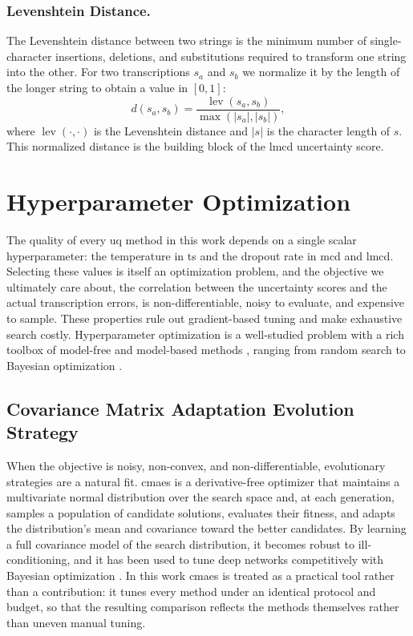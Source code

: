 \subsubsection{Levenshtein Distance.}
The Levenshtein distance \cite{levenshtein1966binary} between two strings is the minimum number of single-character insertions, deletions, and substitutions required to transform one string into the other. For two transcriptions $s_a$ and $s_b$ we normalize it by the length of the longer string to obtain a value in $[0, 1]$:
\begin{equation}
   d(s_a, s_b) = \frac{\operatorname{lev}(s_a, s_b)}{\max(|s_a|, |s_b|)},
\end{equation}
where $\operatorname{lev}(\cdot, \cdot)$ is the Levenshtein distance and $|s|$ is the character length of $s$. This normalized distance is the building block of the \acrshort{lmcd} uncertainty score.

\section{Hyperparameter Optimization}\label{sec:hpo}

The quality of every \acrshort{uq} method in this work depends on a single scalar hyperparameter: the temperature in \acrshort{ts} and the dropout rate in \acrshort{mcd} and \acrshort{lmcd}. Selecting these values is itself an optimization problem, and the objective we ultimately care about, the correlation between the uncertainty scores and the actual transcription errors, is non-differentiable, noisy to evaluate, and expensive to sample. These properties rule out gradient-based tuning and make exhaustive search costly. Hyperparameter optimization is a well-studied problem with a rich toolbox of model-free and model-based methods \cite{Feurer2019}, ranging from random search \cite{bergstra2012random} to Bayesian optimization \cite{snoek2012practical}.

\subsection{Covariance Matrix Adaptation Evolution Strategy}
When the objective is noisy, non-convex, and non-differentiable, evolutionary strategies are a natural fit. \acrfull{cmaes} \cite{hansen2001completely} is a derivative-free optimizer that maintains a multivariate normal distribution over the search space and, at each generation, samples a population of candidate solutions, evaluates their fitness, and adapts the distribution's mean and covariance toward the better candidates. By learning a full covariance model of the search distribution, it becomes robust to ill-conditioning, and it has been used to tune deep networks competitively with Bayesian optimization \cite{loshchilov2016cma}. In this work \acrshort{cmaes} is treated as a practical tool rather than a contribution: it tunes every method under an identical protocol and budget, so that the resulting comparison reflects the methods themselves rather than uneven manual tuning.